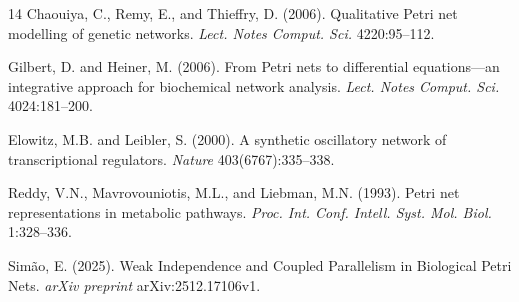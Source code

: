 \documentclass[twocolumn,11pt]{article}
\begin{document}
\begin{thebibliography}{14}
Chaouiya, C., Remy, E., and Thieffry, D. (2006).
\newblock Qualitative Petri net modelling of genetic networks.
\newblock \textit{Lect. Notes Comput. Sci.} 4220:95--112.

Gilbert, D. and Heiner, M. (2006).
\newblock From Petri nets to differential equations---an integrative approach for biochemical network analysis.
\newblock \textit{Lect. Notes Comput. Sci.} 4024:181--200.

Elowitz, M.B. and Leibler, S. (2000).
\newblock A synthetic oscillatory network of transcriptional regulators.
\newblock \textit{Nature} 403(6767):335--338.

Reddy, V.N., Mavrovouniotis, M.L., and Liebman, M.N. (1993).
\newblock Petri net representations in metabolic pathways.
\newblock \textit{Proc. Int. Conf. Intell. Syst. Mol. Biol.} 1:328--336.

Simão, E. (2025).
\newblock Weak Independence and Coupled Parallelism in Biological Petri Nets.
\newblock \textit{arXiv preprint} arXiv:2512.17106v1.

\end{thebibliography}
\end{document}
